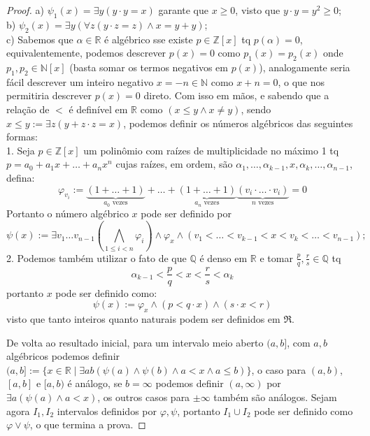 \documentclass[11pt]{article}
\newcommand{\mf}[1]{\mathfrak{#1}}
\newcommand{\mbb}[1]{\mathbb{#1}}
\begin{document}
\begin{proof}
    a) $\psi_1(x)=\exists y(y\cdot y=x)$ garante que $x\geq0$, visto que $y\cdot y=y^2\geq0$;\\
    b) $\psi_2(x)=\exists y(\forall z(y\cdot z=z)\wedge x=y+y)$;\\
    c) Sabemos que $\alpha\in\mbb{R}$ é algébrico sse existe $p\in\mbb{Z}[x]$ tq $p(\alpha)=0$, equivalentemente, podemos descrever $p(x)=0$ como $p_1(x)=p_2(x)$ onde $p_1,p_2\in\mbb{N}[x]$ (basta somar os termos negativos em $p(x)$), analogamente seria fácil descrever um inteiro negativo $x=-n\in\mbb{N}$ como $x+n=0$, o que nos permitiria descrever $p(x)=0$ direto. Com isso em mãos, e sabendo que a relação de $<$ é definível em $\mbb{R}$ como $(x\leq y\wedge x\neq y)$, sendo $x\leq y:=\exists z(y + z\cdot z=x)$, podemos definir os números algébricos das seguintes formas:\\
    1. Seja $p\in\mbb{Z}[x]$ um polinômio com raízes de multiplicidade no máximo 1 tq $p=a_0+a_1x+\dots+a_nx^n$ cujas raízes, em ordem, são $\alpha_1,\dots,\alpha_{k-1},x,\alpha_k,\dots,\alpha_{n-1}$, defina:
    $$\varphi_{v_i}:=\underbrace{(1+\dots+1)}_{a_0\text{ vezes}}+\dots+\underbrace{(1+\dots+1)}_{a_n\text{ vezes}}\underbrace{(v_i\cdot\dots\cdot v_i)}_{n\text{ vezes}}=0$$
    Portanto o número algébrico $x$ pode ser definido por
    $$\psi(x):=\exists v_1\dots v_{n-1}\left(\bigwedge_{1\leq i< n}\varphi_i\right)\wedge\varphi_x\wedge(v_1<\dots<v_{k-1}<x<v_k<\dots<v_{n-1});$$
    2. Podemos também utilizar o fato de que $\mbb{Q}$ é denso em $\mbb{R}$ e tomar $\tfrac{p}{q},\tfrac{r}{s}\in\mbb{Q}$ tq $$\alpha_{k-1}<\frac{p}{q}<x<\frac{r}{s}<\alpha_k$$
    portanto $x$ pode ser definido como:
    $$\psi(x):=\varphi_x\wedge(p<q\cdot x)\wedge(s\cdot x<r)$$
    visto que tanto inteiros quanto naturais podem ser definidos em $\mf{R}$.

    De volta ao resultado inicial, para um intervalo meio aberto $(a,b]$, com $a, b$ algébricos podemos definir $(a,b]:=\{x\in\mbb{R}\mid\exists ab(\psi(a)\wedge\psi(b)\wedge a<x\wedge a\leq b)\}$, o caso para $(a,b)$, $[a,b]$ e $[a,b)$ é análogo, se $b=\infty$ podemos definir $(a,\infty)$ por $\exists a(\psi(a)\wedge a<x)$, os outros casos para $\pm\infty$ também são análogos. Sejam agora $I_1,I_2$ intervalos definidos por $\varphi,\psi$, portanto $I_1\cup I_2$ pode ser definido como $\varphi\vee\psi$, o que termina a prova.
\end{proof}
\end{document}
